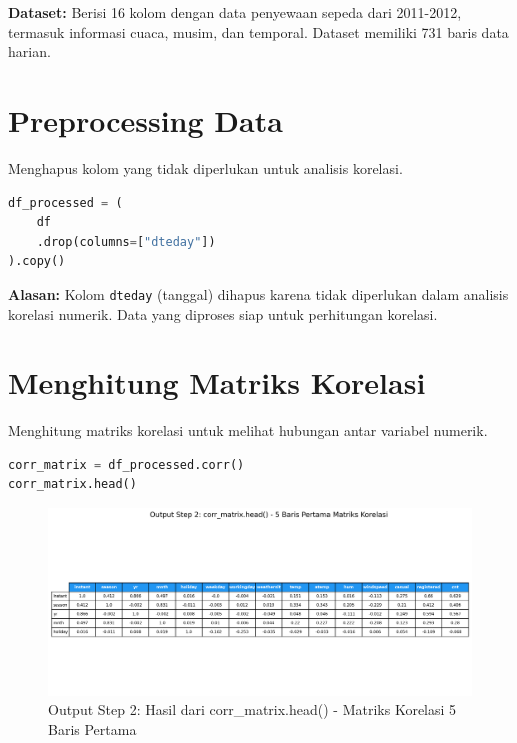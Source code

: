 \documentclass[11pt,a4paper]{article}
\begin{document}
    \begin{tcolorbox}
        \textbf{Dataset:} Berisi 16 kolom dengan data penyewaan sepeda dari 2011-2012, termasuk informasi cuaca, musim, dan temporal.
        \hspace{1cm}Dataset memiliki 731 baris data harian.
    \end{tcolorbox}


    \section{Preprocessing Data}
    Menghapus kolom yang tidak diperlukan untuk analisis korelasi.
    \begin{lstlisting}[language=Python]
df_processed = (
    df
    .drop(columns=["dteday"])
).copy()
    \end{lstlisting}
    \begin{tcolorbox}
        \textbf{Alasan:} Kolom \texttt{dteday} (tanggal) dihapus karena tidak diperlukan dalam analisis korelasi numerik.
        \hspace{1cm}Data yang diproses siap untuk perhitungan korelasi.
    \end{tcolorbox}


    \section{Menghitung Matriks Korelasi}
    Menghitung matriks korelasi untuk melihat hubungan antar variabel numerik.
    \begin{lstlisting}[language=Python]
corr_matrix = df_processed.corr()
corr_matrix.head()
    \end{lstlisting}

    \begin{figure}[h]
        \centering
        \includegraphics[width=1.0\textwidth]{./OUTPUT/step2_correlation_head.png}
        \caption{Output Step 2: Hasil dari corr\_matrix.head() - Matriks Korelasi 5 Baris Pertama}
        \label{fig:corr_head}
    \end{figure}
\end{document}
